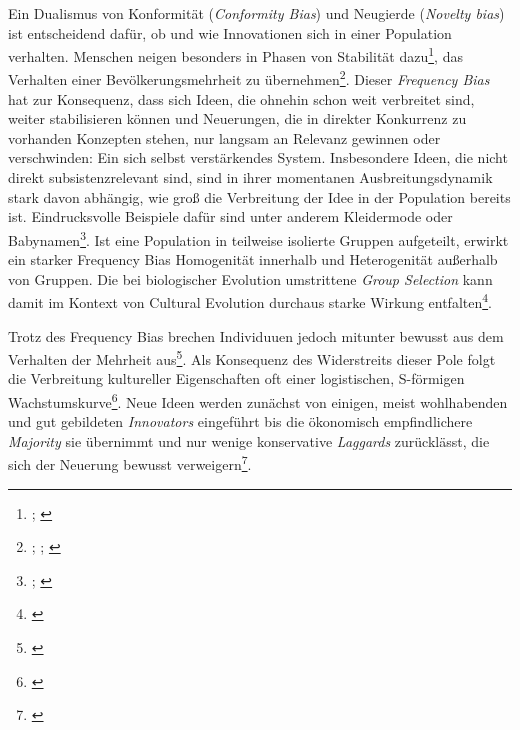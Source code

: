 \documentclass[openany,twoside,twocolumn]{book}
\let\rmarkdownfootnote\footnote%
\def\footnote{\protect\rmarkdownfootnote}
\begin{document}
Ein Dualismus von Konformität (\emph{Conformity Bias}) und Neugierde
(\emph{Novelty bias}) ist entscheidend dafür, ob und wie Innovationen
sich in einer Population verhalten. Menschen neigen besonders in Phasen
von Stabilität dazu\footnote{\textcite{henrich_evolution_1998};
  \textcite{kendal_evolution_2009}}, das Verhalten einer
Bevölkerungsmehrheit zu übernehmen\footnote{\textcite{efferson_conformists_2008};
  \textcite{giraldeau_social_1994}; \textcite{henrich_evolution_1998}}.
Dieser \emph{Frequency Bias} hat zur Konsequenz, dass sich Ideen, die
ohnehin schon weit verbreitet sind, weiter stabilisieren können und
Neuerungen, die in direkter Konkurrenz zu vorhanden Konzepten stehen,
nur langsam an Relevanz gewinnen oder verschwinden: Ein sich selbst
verstärkendes System. Insbesondere Ideen, die nicht direkt
subsistenzrelevant sind, sind in ihrer momentanen Ausbreitungsdynamik
stark davon abhängig, wie groß die Verbreitung der Idee in der
Population bereits ist. Eindrucksvolle Beispiele dafür sind unter
anderem Kleidermode oder Babynamen\footnote{\textcite{acerbi_biases_2014};
  \textcite{acerbi_logic_2012}}. Ist eine Population in teilweise
isolierte Gruppen aufgeteilt, erwirkt ein starker Frequency Bias
Homogenität innerhalb und Heterogenität außerhalb von Gruppen. Die bei
biologischer Evolution umstrittene \emph{Group Selection} kann damit im
Kontext von Cultural Evolution durchaus starke Wirkung
entfalten\footnote{\textcite{smith_cultural_1992}}.

Trotz des Frequency Bias brechen Individuuen jedoch mitunter bewusst aus
dem Verhalten der Mehrheit aus\footnote{\textcite{henrich_evolution_2003}}.
Als Konsequenz des Widerstreits dieser Pole folgt die Verbreitung
kultureller Eigenschaften oft einer logistischen, S-förmigen
Wachstumskurve\footnote{\textcite{henrich_cultural_2001}}. Neue Ideen
werden zunächst von einigen, meist wohlhabenden und gut gebildeten
\emph{Innovators} eingeführt bis die ökonomisch empfindlichere
\emph{Majority} sie übernimmt und nur wenige konservative
\emph{Laggards} zurücklässt, die sich der Neuerung bewusst
verweigern\footnote{\textcite{rogers_diffusion_1983}}.
\end{document}
